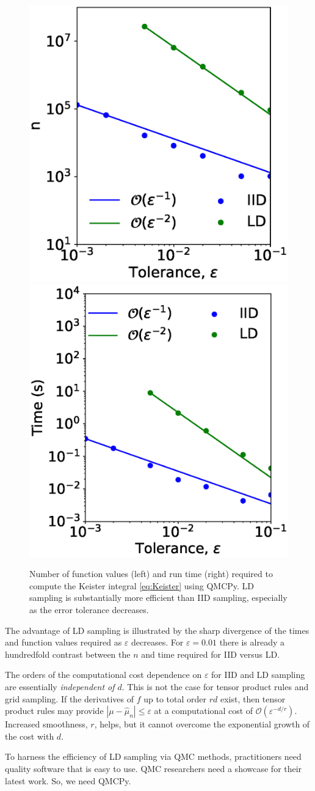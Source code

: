\documentclass[11pt]{NSFamsart}
\def\abs#1{\ensuremath{\left \lvert #1 \right \rvert}}
\newcommand{\Order}{\mathcal{O}}
\newcommand{\hmu}{\hat{\mu}}
\begin{document}
\begin{figure}
	\centering
	\includegraphics[height =0.35\textwidth]{ProgramsImages/keister_n.eps}
	\includegraphics[height =0.35\textwidth]{ProgramsImages/keister_timing.eps} 
	\caption{Number of function values (left) and run time (right) required to compute the Keister integral \eqref{eq:Keister} using QMCPy.  LD sampling is substantially more efficient than IID sampling, especially as the error tolerance decreases.}
	\label{fig:KeisterTimes}
\end{figure}

The advantage of LD sampling is illustrated by the sharp divergence of the times and function values required as $\varepsilon$ decreases.  For $\varepsilon = 0.01$ there is already a hundredfold contrast between the $n$ and time required for IID versus LD.

The orders of the computational cost dependence on $\varepsilon$ for IID and LD sampling are essentially \emph{independent of $d$}.  This is not the case for tensor product rules and grid sampling.  If the derivatives of $f$ up to total order $rd$ exist, then tensor product rules may provide $\abs{\mu - \hmu_n} \le \varepsilon$  at a computational cost of $\Order(\varepsilon^{-d/r})$.   Increased smoothness, $r$, helps, but it cannot overcome the exponential growth of the cost with $d$.

To harness the efficiency of LD sampling via QMC methods, practitioners need quality software that is easy to use.  QMC researchers need a showcase  for their latest work.  So,  we need QMCPy.
\end{document}
